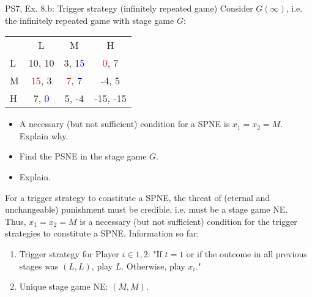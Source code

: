 \begin{frame}{PS7, Ex. 8.b: Trigger strategy (infinitely repeated game)}
    Consider $G(\infty)$, i.e. the infinitely repeated game with stage game $G$: \vspace{-6pt}
    \begin{table}
      \begin{tabular}{l|c|c|c|}
        \multicolumn{1}{c}{} & \multicolumn{1}{c}{L} & \multicolumn{1}{c}{M} & \multicolumn{1}{c}{H} \\\cline{2-4}
        L & 10, 10 & 3, \textcolor{blue}{15} & \textcolor{red}{0}, 7 \\\cline{2-4}
        M & \textcolor{red}{15}, 3 & \textcolor{red}{7}, \textcolor{blue}{7} & -4, 5 \\\cline{2-4}
        H & 7, \textcolor{blue}{0} & 5, -4 & -15, -15 \\\cline{2-4}
      \end{tabular}
    \end{table}
    \begin{itemize}
      \item[(b)] A necessary (but not sufficient) condition for a SPNE is $x_1 = x_2 = M$. Explain why.
    \end{itemize}
    \begin{multicols}{2}
      \begin{itemize}
        \item[(Step a)] Find the PSNE in the stage game $G$.
        \item[(Step b)] Explain.
      \end{itemize}
      For a trigger strategy to constitute a SPNE, the threat of (eternal and unchangeable) punishment must be credible, i.e. must be a stage game NE.\\\medskip
      Thus, $x_1 = x_2 = M$ is a necessary (but not sufficient) condition for the trigger strategies to constitute a SPNE.
      \vfill\null\columnbreak
      Information so far:
      \begin{enumerate}
        \item Trigger strategy for Player $i\in1,2$: "If $t=1$ or if the outcome in all previous stages was $(L,L)$, play $L$. Otherwise, play $x_i$."
        \item Unique stage game NE: $(M,M)$.
      \end{enumerate}
      \vfill\null
    \end{multicols}
\end{frame}


